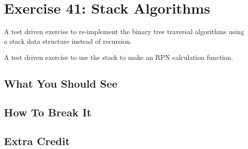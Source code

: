 \chapter{Exercise 41: Stack Algorithms}

A test driven exercise to re-implement the binary tree traversal algorithms using a stack data structure
instead of recursion.

A test driven exercise to use the stack to make an RPN calculation function.


\section{What You Should See}


\section{How To Break It}


\section{Extra Credit}



